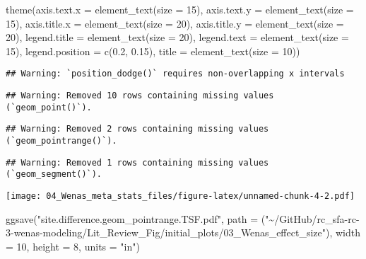 \documentclass[
]{article}
\newenvironment{Shaded}{\begin{snugshade}}{\end{snugshade}}
\newcommand{\AttributeTok}[1]{\textcolor[rgb]{0.77,0.63,0.00}{#1}}
\newcommand{\DecValTok}[1]{\textcolor[rgb]{0.00,0.00,0.81}{#1}}
\newcommand{\FloatTok}[1]{\textcolor[rgb]{0.00,0.00,0.81}{#1}}
\newcommand{\FunctionTok}[1]{\textcolor[rgb]{0.00,0.00,0.00}{#1}}
\newcommand{\NormalTok}[1]{#1}
\newcommand{\StringTok}[1]{\textcolor[rgb]{0.31,0.60,0.02}{#1}}
\begin{document}
\begin{Shaded}
\begin{Highlighting}[]
  \FunctionTok{theme}\NormalTok{(}\AttributeTok{axis.text.x =} \FunctionTok{element\_text}\NormalTok{(}\AttributeTok{size =} \DecValTok{15}\NormalTok{),}
        \AttributeTok{axis.text.y =} \FunctionTok{element\_text}\NormalTok{(}\AttributeTok{size =} \DecValTok{15}\NormalTok{),}
        \AttributeTok{axis.title.x =} \FunctionTok{element\_text}\NormalTok{(}\AttributeTok{size =} \DecValTok{20}\NormalTok{),}
        \AttributeTok{axis.title.y =} \FunctionTok{element\_text}\NormalTok{(}\AttributeTok{size =} \DecValTok{20}\NormalTok{),}
        \AttributeTok{legend.title =} \FunctionTok{element\_text}\NormalTok{(}\AttributeTok{size =} \DecValTok{20}\NormalTok{),}
        \AttributeTok{legend.text =} \FunctionTok{element\_text}\NormalTok{(}\AttributeTok{size =} \DecValTok{15}\NormalTok{),}
        \AttributeTok{legend.position =} \FunctionTok{c}\NormalTok{(}\FloatTok{0.2}\NormalTok{, }\FloatTok{0.15}\NormalTok{),}
        \AttributeTok{title =} \FunctionTok{element\_text}\NormalTok{(}\AttributeTok{size =} \DecValTok{10}\NormalTok{))}
\end{Highlighting}
\end{Shaded}

\begin{verbatim}
## Warning: `position_dodge()` requires non-overlapping x intervals
\end{verbatim}

\begin{verbatim}
## Warning: Removed 10 rows containing missing values (`geom_point()`).
\end{verbatim}

\begin{verbatim}
## Warning: Removed 2 rows containing missing values (`geom_pointrange()`).
\end{verbatim}

\begin{verbatim}
## Warning: Removed 1 rows containing missing values (`geom_segment()`).
\end{verbatim}

\texttt{[image: 04\_Wenas\_meta\_stats\_files/figure-latex/unnamed-chunk-4-2.pdf]}

\begin{Shaded}
\begin{Highlighting}[]
\FunctionTok{ggsave}\NormalTok{(}\StringTok{"site.difference.geom\_pointrange.TSF.pdf"}\NormalTok{,}
       \AttributeTok{path =}\NormalTok{ (}\StringTok{"\textasciitilde{}/GitHub/rc\_sfa{-}rc{-}3{-}wenas{-}modeling/Lit\_Review\_Fig/initial\_plots/03\_Wenas\_effect\_size"}\NormalTok{),}
       \AttributeTok{width =} \DecValTok{10}\NormalTok{, }\AttributeTok{height =} \DecValTok{8}\NormalTok{, }\AttributeTok{units =} \StringTok{"in"}\NormalTok{)}
\end{Highlighting}
\end{Shaded}
\end{document}
